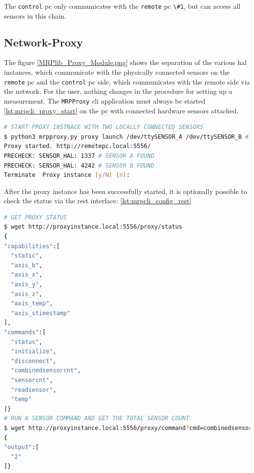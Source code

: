 The \passthrough{\lstinline!control!} \gls{pc} only communicates with
the \passthrough{\lstinline!remote!} \gls{pc}
\passthrough{\lstinline!\#1!}, but can access all sensors in this chain.

\hypertarget{network-proxy}{%
\subsection{Network-Proxy}\label{network-proxy}}

The figure \ref{MRPlib_Proxy_Module.png} shows the separation of the
various \gls{hal} instances, which communicate with the physically
connected sensors on the \passthrough{\lstinline!remote!} \gls{pc} and
the \passthrough{\lstinline!control!} \gls{pc} side, which communicates
with the remote side via the network. For the user, nothing changes in
the procedure for setting up a measurement. The
\passthrough{\lstinline!MRPProxy!} \gls{cli} application must always be
started \ref{lst:mrpcli_proxy_start} on the \gls{pc} with connected
hardware sensors attached.

\begin{lstlisting}[language=bash, caption={MRPproxy usage to enable local sensor usage over network}, label=lst:mrpcli_proxy_start]
# START PROXY INSTNACE WITH TWO LOCALLY CONNECTED SENSORS
$ python3 mrpproxy.py proxy launch /dev/ttySENSOR_A /dev/ttySENSOR_B # add another proxy instance http://proxyinstance_2.local for multi-sensor, multi-proxy chain
Proxy started. http://remotepc.local:5556/
PRECHECK: SENSOR_HAL: 1337 # SENSOR A FOUND
PRECHECK: SENSOR_HAL: 4242 # SENSOR B FOUND
Terminate  Proxy instance [y/N] [n]: 
\end{lstlisting}

After the proxy instance has been successfully started, it is optionally
possible to check the status via the \gls{rest} interface:
\ref{lst:mrpcli_config_rest}

\begin{lstlisting}[language=bash, caption={MRPProxy REST endpoint query examples}, label=lst:mrpcli_config_rest]
# GET PROXY STATUS
$ wget http://proxyinstance.local:5556/proxy/status
{
"capabilities":[
  "static",
  "axis_b",
  "axis_x",
  "axis_y",
  "axis_z",
  "axis_temp",
  "axis_stimestamp"
],
"commands":[
  "status",
  "initialize",
  "disconnect",
  "combinedsensorcnt",
  "sensorcnt",
  "readsensor",
  "temp"
]}
# RUN A SENSOR COMMAND AND GET THE TOTAL SENSOR COUNT
$ wget http://proxyinstance.local:5556/proxy/command?cmd=combinedsensorcnt
{
"output":[
  "2"
]}
\end{lstlisting}

